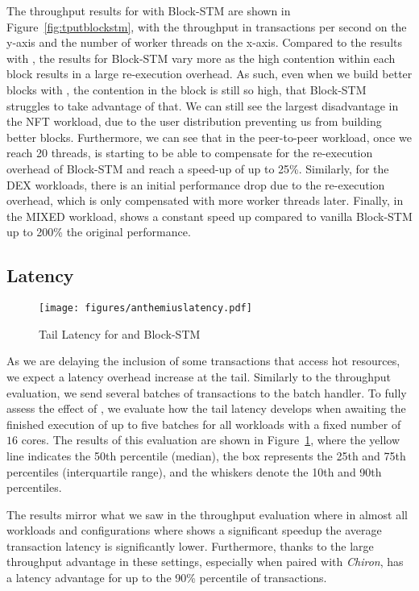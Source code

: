 The throughput results for \sys with Block-STM are shown in Figure~\ref{fig:tputblockstm}, with the throughput in transactions per second on the y-axis and the number of worker threads on the x-axis. 
Compared to the results with \basesys, the results for Block-STM vary more as the high contention within each block results in a large re-execution overhead. 
As such, even when we build better blocks with \sys, the contention in the block is still so high, that Block-STM struggles to take advantage of that.
We can still see the largest disadvantage in the NFT workload, due to the user distribution preventing us from building better blocks. Furthermore, we can see that in the peer-to-peer workload, once we reach 20 threads, \sys is starting to be able to compensate for the re-execution overhead of Block-STM and reach a speed-up of up to 25\%. Similarly, for the DEX workloads, there is an initial performance drop due to the re-execution overhead, which is only compensated with more worker threads later.
Finally, in the MIXED workload, \sys shows a constant speed up compared to vanilla Block-STM up to 200\% the original performance.


\subsection{Latency}

\begin{figure}[t]
\texttt{[image: figures/anthemiuslatency.pdf]} 
\caption{Tail Latency for \basesys and Block-STM}
\label{fig:latency}
\end{figure}


As we are delaying the inclusion of some transactions that access hot resources, we expect a latency overhead increase at the tail. 
Similarly to the throughput evaluation, we send several batches of transactions to the batch handler. To fully assess the effect of \sys, we evaluate how the tail latency develops when awaiting the finished execution of up to five batches for all workloads with a fixed number of $16$ cores.
The results of this evaluation are shown in Figure~\ref{fig:latency}, where the yellow line indicates the 50th percentile (median), the box represents the 25th and 75th percentiles (interquartile range), and the whiskers denote the 10th and 90th percentiles.

The results mirror what we saw in the throughput evaluation where in almost all workloads and configurations where \sys shows a significant speedup the average transaction latency is significantly lower. Furthermore, thanks to the large throughput advantage in these settings, especially when paired with \textit{Chiron}, \sys has a latency advantage for up to the 90\% percentile of transactions.


